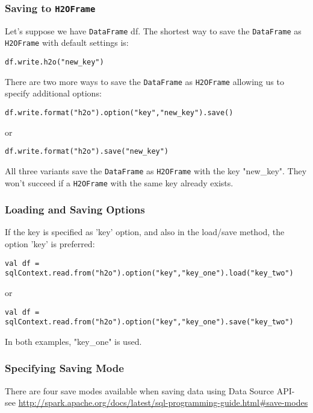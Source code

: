 \subsubsection{Saving to \texttt{H2OFrame}}

Let's suppose we have \texttt{DataFrame} df. The shortest way to save the \texttt{DataFrame} as \texttt{H2OFrame} with default settings is:
\begin{lstlisting}[style=Scala]
df.write.h2o("new_key")
\end{lstlisting}

There are two more ways to save the \texttt{DataFrame} as \texttt{H2OFrame} allowing us to specify additional options:
\begin{lstlisting}[style=Scala]
df.write.format("h2o").option("key","new_key").save()
\end{lstlisting}
or
\begin{lstlisting}[style=Scala]
df.write.format("h2o").save("new_key")
\end{lstlisting}

All three variants save the \texttt{DataFrame} as \texttt{H2OFrame} with the key "new\_key". They won't succeed if a \texttt{H2OFrame} with the same key already exists.

\subsubsection{Loading and Saving Options}

If the key is specified as 'key' option, and also in the load/save method, the option 'key' is preferred:
\begin{lstlisting}[style=Scala]
val df = sqlContext.read.from("h2o").option("key","key_one").load("key_two")
\end{lstlisting}
or
\begin{lstlisting}[style=Scala]
val df = sqlContext.read.from("h2o").option("key","key_one").save("key_two")
\end{lstlisting}

In both examples, "key\_one" is used.

\subsubsection{Specifying Saving Mode}

There are four save modes available when saving data using Data Source API- see \url{http://spark.apache.org/docs/latest/sql-programming-guide.html#save-modes}


